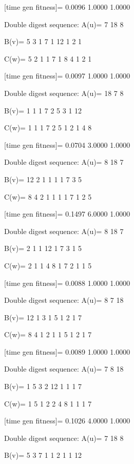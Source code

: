 [time gen fitness]=
    0.0096    1.0000    1.0000

Double digest sequence:
A(u)=
     7    18     8

B(v)=
     5     3     1     7     1    12     1     2     1

C(w)=
     5     2     1     1     7     1     8     4     1     2     1

[time gen fitness]=
    0.0097    1.0000    1.0000

Double digest sequence:
A(u)=
    18     7     8

B(v)=
     1     1     1     7     2     5     3     1    12

C(w)=
     1     1     1     7     2     5     1     2     1     4     8

[time gen fitness]=
    0.0704    3.0000    1.0000

Double digest sequence:
A(u)=
     8    18     7

B(v)=
    12     2     1     1     1     1     7     3     5

C(w)=
     8     4     2     1     1     1     1     7     1     2     5

[time gen fitness]=
    0.1497    6.0000    1.0000

Double digest sequence:
A(u)=
     8    18     7

B(v)=
     2     1     1    12     1     7     3     1     5

C(w)=
     2     1     1     4     8     1     7     2     1     1     5

[time gen fitness]=
    0.0088    1.0000    1.0000

Double digest sequence:
A(u)=
     8     7    18

B(v)=
    12     1     3     1     5     1     2     1     7

C(w)=
     8     4     1     2     1     1     5     1     2     1     7

[time gen fitness]=
    0.0089    1.0000    1.0000

Double digest sequence:
A(u)=
     7     8    18

B(v)=
     1     5     3     2    12     1     1     1     7

C(w)=
     1     5     1     2     2     4     8     1     1     1     7

[time gen fitness]=
    0.1026    4.0000    1.0000

Double digest sequence:
A(u)=
     7    18     8

B(v)=
     5     3     7     1     1     2     1     1    12

